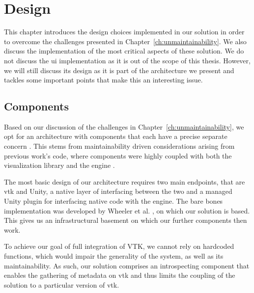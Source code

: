 \chapter{Design}
\label{ch:design}

This chapter introduces the design choices implemented in our solution in order to overcome the challenges presented in Chapter~\ref{ch:unmaintainability}. We also discuss the implementation of the most critical aspects of these solution. We do not discuss the \acrshort{ui} implementation as it is out of the scope of this thesis. However, we will still discuss its design as it is part of the architecture we present and tackles some important points that make this an interesting issue.


\section{Components}
\label{sec:components}

Based on our discussion of the challenges in Chapter~\ref{ch:unmaintainability}, we opt for an architecture with components that each have a precise separate concern \cite{Hursch95separationof}. This stems from maintainability driven considerations arising from previous work's code, where components were highly coupled with both the visualization library and the engine \cite{dreuning_visual_2016, duking_potential_2018, kruis_creating_2017, wheeler_virtual_2018}.

The most basic design of our architecture requires two main endpoints, that are \acrshort{vtk} and Unity, a native layer of interfacing between the two and a managed Unity plugin for interfacing native code with the engine. The bare bones implementation was developed by Wheeler et al. \cite{wheeler_virtual_2018}, on which our solution is based. This gives us an infrastructural basement on which our further components then work.

To achieve our goal of full integration of VTK, we cannot rely on hardcoded functions, which would impair the generality of the system, as well as its maintainability. As such, our solution comprises an introspecting component that enables the gathering of metadata on \acrshort{vtk} and thus limits the coupling of the solution to a particular version of \acrshort{vtk}.

